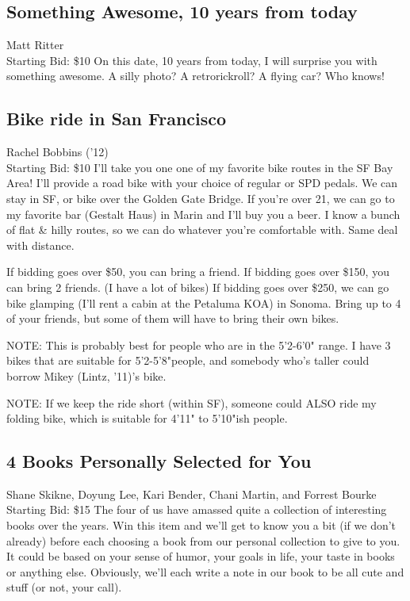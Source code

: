 \documentclass[11pt]{article}
\begin{document}
\subsection{Something Awesome, 10 years from today}
Matt Ritter
\\
Starting Bid: \$10
\newline
On this date, 10 years from today, I will surprise you with something awesome. A silly photo? A retrorickroll? A flying car? Who knows!
\subsection{Bike ride in San Francisco}
Rachel Bobbins ('12)
\\
Starting Bid: \$10
\newline
I'll take you one one of my favorite bike routes in the SF Bay Area! I'll provide a road bike with your choice of regular or SPD pedals. We can stay in SF, or bike over the Golden Gate Bridge. If you're over 21, we can go to my favorite bar (Gestalt Haus) in Marin and I'll buy you a beer. I know a bunch of flat \& hilly routes, so we can do whatever you're comfortable with. Same deal with distance.

If bidding goes over \$50, you can bring a friend. 
If bidding goes over \$150, you can bring 2 friends. (I have a lot of bikes)
If bidding goes over \$250, we can go bike glamping (I'll rent a cabin at the Petaluma KOA) in Sonoma. Bring up to 4 of your friends, but some of them will have to bring their own bikes.

NOTE: This is probably best for people who are in the 5'2-6'0" range. I have 3 bikes that are suitable for 5'2-5'8"people, and somebody who's taller could borrow Mikey (Lintz, '11)'s bike. 

NOTE: If we keep the ride short (within SF), someone could ALSO ride my folding bike, which is suitable for 4'11" to 5'10"ish people.
\subsection{4 Books Personally Selected for You}
Shane Skikne, Doyung Lee, Kari Bender, Chani Martin, and Forrest Bourke
\\
Starting Bid: \$15
\newline
The four of us have amassed quite a collection of interesting books over the years. Win this item and we'll get to know you a bit (if we don't already) before each choosing a book from our personal collection to give to you. It could be based on your sense of humor, your goals in life, your taste in books or anything else.  Obviously, we'll each write a note in our book to be all cute and stuff (or not, your call).
\end{document}
